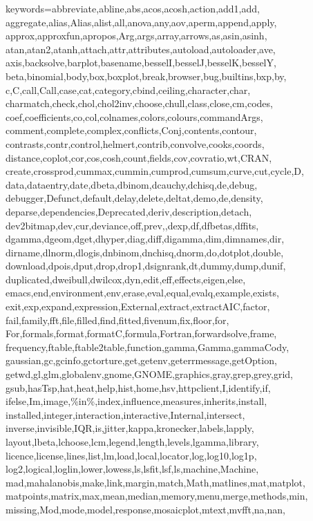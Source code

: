   {keywords={abbreviate,abline,abs,acos,acosh,action,add1,add,
      aggregate,alias,Alias,alist,all,anova,any,aov,aperm,append,apply,
      approx,approxfun,apropos,Arg,args,array,arrows,as,asin,asinh,
      atan,atan2,atanh,attach,attr,attributes,autoload,autoloader,ave,
      axis,backsolve,barplot,basename,besselI,besselJ,besselK,besselY,
      beta,binomial,body,box,boxplot,break,browser,bug,builtins,bxp,by,
      c,C,call,Call,case,cat,category,cbind,ceiling,character,char,
      charmatch,check,chol,chol2inv,choose,chull,class,close,cm,codes,
      coef,coefficients,co,col,colnames,colors,colours,commandArgs,
      comment,complete,complex,conflicts,Conj,contents,contour,
      contrasts,contr,control,helmert,contrib,convolve,cooks,coords,
      distance,coplot,cor,cos,cosh,count,fields,cov,covratio,wt,CRAN,
      create,crossprod,cummax,cummin,cumprod,cumsum,curve,cut,cycle,D,
      data,dataentry,date,dbeta,dbinom,dcauchy,dchisq,de,debug,
      debugger,Defunct,default,delay,delete,deltat,demo,de,density,
      deparse,dependencies,Deprecated,deriv,description,detach,
      dev2bitmap,dev,cur,deviance,off,prev,,dexp,df,dfbetas,dffits,
      dgamma,dgeom,dget,dhyper,diag,diff,digamma,dim,dimnames,dir,
      dirname,dlnorm,dlogis,dnbinom,dnchisq,dnorm,do,dotplot,double,
      download,dpois,dput,drop,drop1,dsignrank,dt,dummy,dump,dunif,
      duplicated,dweibull,dwilcox,dyn,edit,eff,effects,eigen,else,
      emacs,end,environment,env,erase,eval,equal,evalq,example,exists,
      exit,exp,expand,expression,External,extract,extractAIC,factor,
      fail,family,fft,file,filled,find,fitted,fivenum,fix,floor,for,
      For,formals,format,formatC,formula,Fortran,forwardsolve,frame,
      frequency,ftable,ftable2table,function,gamma,Gamma,gammaCody,
      gaussian,gc,gcinfo,gctorture,get,getenv,geterrmessage,getOption,
      getwd,gl,glm,globalenv,gnome,GNOME,graphics,gray,grep,grey,grid,
      gsub,hasTsp,hat,heat,help,hist,home,hsv,httpclient,I,identify,if,
      ifelse,Im,image,\%in\%,index,influence,measures,inherits,install,
      installed,integer,interaction,interactive,Internal,intersect,
      inverse,invisible,IQR,is,jitter,kappa,kronecker,labels,lapply,
      layout,lbeta,lchoose,lcm,legend,length,levels,lgamma,library,
      licence,license,lines,list,lm,load,local,locator,log,log10,log1p,
      log2,logical,loglin,lower,lowess,ls,lsfit,lsf,ls,machine,Machine,
      mad,mahalanobis,make,link,margin,match,Math,matlines,mat,matplot,
      matpoints,matrix,max,mean,median,memory,menu,merge,methods,min,
      missing,Mod,mode,model,response,mosaicplot,mtext,mvfft,na,nan,
}}
